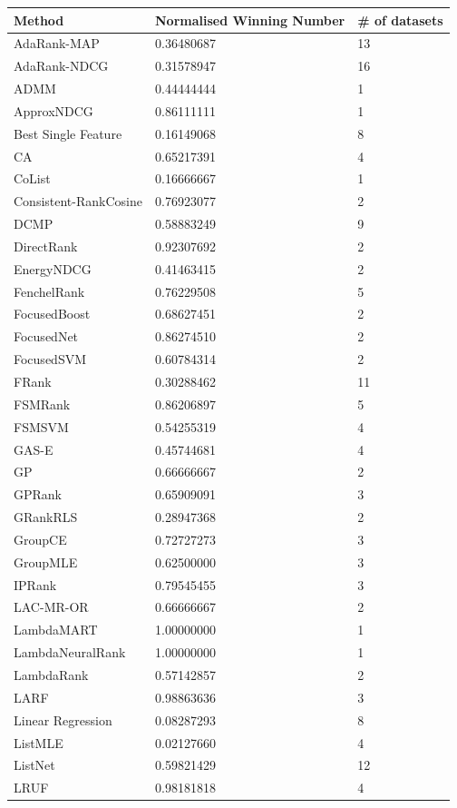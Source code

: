 \documentclass{sig-alternate-2013}
\begin{document}
\begin{table}
\begin{tabular}{l|l|l}
Method & Normalised Winning Number & \# of datasets \\
\hline
AdaRank-MAP & 0.36480687 & 13 \\ 
AdaRank-NDCG & 0.31578947 & 16 \\ 
ADMM & 0.44444444 & 1 \\ 
ApproxNDCG & 0.86111111 & 1 \\ 
Best Single Feature & 0.16149068 & 8 \\ 
CA & 0.65217391 & 4 \\ 
CoList & 0.16666667 & 1 \\ 
Consistent-RankCosine & 0.76923077 & 2 \\ 
DCMP & 0.58883249 & 9 \\ 
DirectRank & 0.92307692 & 2 \\ 
EnergyNDCG & 0.41463415 & 2 \\ 
FenchelRank & 0.76229508 & 5 \\ 
FocusedBoost & 0.68627451 & 2 \\ 
FocusedNet & 0.86274510 & 2 \\ 
FocusedSVM & 0.60784314 & 2 \\ 
FRank & 0.30288462 & 11 \\ 
FSMRank & 0.86206897 & 5 \\ 
FSMSVM & 0.54255319 & 4 \\ 
GAS-E & 0.45744681 & 4 \\ 
GP & 0.66666667 & 2 \\ 
GPRank & 0.65909091 & 3 \\ 
GRankRLS & 0.28947368 & 2 \\ 
GroupCE & 0.72727273 & 3 \\ 
GroupMLE & 0.62500000 & 3 \\ 
IPRank & 0.79545455 & 3 \\ 
LAC-MR-OR & 0.66666667 & 2 \\ 
LambdaMART & 1.00000000 & 1 \\ 
LambdaNeuralRank & 1.00000000 & 1 \\ 
LambdaRank & 0.57142857 & 2 \\ 
LARF & 0.98863636 & 3 \\ 
Linear Regression & 0.08287293 & 8 \\ 
ListMLE & 0.02127660 & 4 \\ 
ListNet & 0.59821429 & 12 \\ 
LRUF & 0.98181818 & 4 \\ 

\end{tabular}
\end{table}
\end{document}
